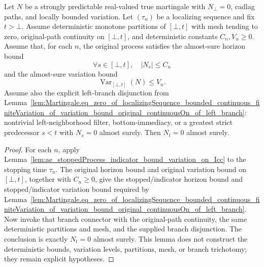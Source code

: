 \begin{lemma}\label{lem:Martingale.eq_zero_of_localizingSequence_of_bound_variation_bound_original_continuousOn_of_left_branch}
Let \(N\) be a strongly predictable real-valued true martingale with
\(N_\bot=0\), cadlag paths, and locally bounded variation.  Let
\((\tau_n)\) be a localizing sequence and fix \(t>\bot\).  Assume deterministic
monotone partitions of \([\bot,t]\) with mesh tending to zero, original-path
continuity on \([\bot,t]\), and deterministic constants \(C_n,V_n\ge0\).
Assume that, for each \(n\), the original process satisfies the almost-sure
horizon bound
\[
  \forall s\in[\bot,t],\quad |N_s|\le C_n
\]
and the almost-sure variation bound
\[
  \operatorname{Var}_{[\bot,t]}(N)\le V_n .
\]
Assume also the explicit left-branch disjunction from
Lemma~\ref{lem:Martingale.eq_zero_of_localizingSequence_bounded_continuous_finiteVariation_of_variation_bound_original_continuousOn_of_left_branch}:
nontrivial left-neighborhood filter, bottom-immediacy, or a greatest strict
predecessor \(s<t\) with \(N_s=0\) almost surely.  Then \(N_t=0\) almost surely.
\end{lemma}

\begin{proof}
For each \(n\), apply
Lemma~\ref{lem:ae_stoppedProcess_indicator_bound_variation_on_Icc} to the
stopping time \(\tau_n\).  The original horizon bound and original variation
bound on \([\bot,t]\), together with \(C_n\ge0\), give the stopped/indicator
horizon bound and stopped/indicator variation bound required by
Lemma~\ref{lem:Martingale.eq_zero_of_localizingSequence_bounded_continuous_finiteVariation_of_variation_bound_original_continuousOn_of_left_branch}.
Now invoke that branch connector with the original-path continuity, the same
deterministic partitions and mesh, and the supplied branch disjunction.  The
conclusion is exactly \(N_t=0\) almost surely.  This lemma does not construct
the deterministic bounds, variation levels, partitions, mesh, or branch
trichotomy; they remain explicit hypotheses.
\end{proof}

